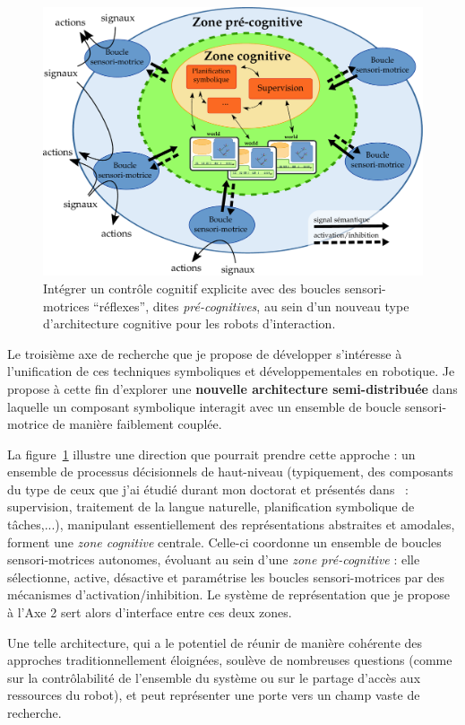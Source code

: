 \documentclass[a4paper]{article}
\begin{document}
\begin{figure}
    \centering
    \includegraphics[width=1.0\linewidth]{archi}
    \caption{\small Intégrer un contrôle cognitif explicite avec des boucles
        sensori-motrices ``réflexes'', dites \emph{pré-cognitives}, au sein
    d'un nouveau type d'architecture cognitive pour les robots d'interaction.}
    \label{archi}
\end{figure}

Le troisième axe de recherche que je propose de développer s'intéresse à
l'unification de ces techniques symboliques et développementales en robotique.
Je propose à cette fin d'explorer une \textbf{nouvelle architecture
semi-distribuée} dans laquelle un composant symbolique
interagit avec un ensemble de boucle sensori-motrice de manière faiblement
couplée.

La figure~\ref{archi} illustre une direction que pourrait prendre cette approche
: un ensemble de processus décisionnels de haut-niveau (typiquement, des
composants du type de ceux que j'ai étudié durant mon doctorat et présentés
dans~\cite{lemaignan2015human} : supervision, traitement de la langue naturelle,
planification symbolique de tâches,...), manipulant essentiellement des
représentations abstraites et amodales, forment une \emph{zone cognitive}
centrale. Celle-ci coordonne un ensemble de boucles sensori-motrices autonomes,
évoluant au sein d'une \emph{zone pré-cognitive} : elle sélectionne, active,
désactive et paramétrise les boucles sensori-motrices par des mécanismes
d'activation/inhibition. Le système de représentation que je propose à l'Axe 2
sert alors d'interface entre ces deux zones.

Une telle architecture, qui a le potentiel de réunir de manière cohérente des
approches traditionnellement éloignées, soulève de nombreuses questions (comme
sur la contrôlabilité de l'ensemble du système ou sur le partage d'accès aux
ressources du robot), et peut représenter une porte vers un champ vaste de
recherche.
\end{document}
